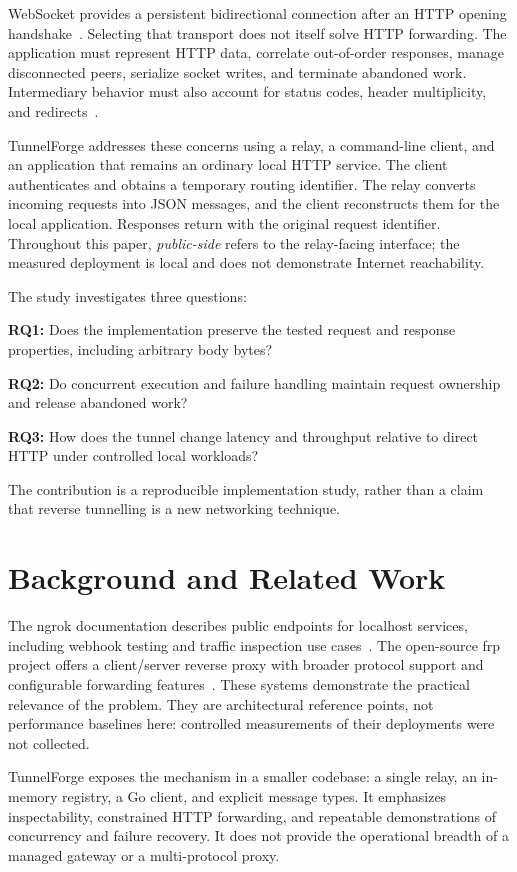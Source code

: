 \documentclass[conference,letterpaper]{IEEEtran}
\begin{document}
WebSocket provides a persistent bidirectional connection after an HTTP opening
handshake~\cite{websocket}. Selecting that transport does not itself solve HTTP
forwarding. The application must represent HTTP data, correlate out-of-order
responses, manage disconnected peers, serialize socket writes, and terminate
abandoned work. Intermediary behavior must also account for status codes,
header multiplicity, and redirects~\cite{http}.

TunnelForge addresses these concerns using a relay, a command-line client, and
an application that remains an ordinary local HTTP service. The client
authenticates and obtains a temporary routing identifier. The relay converts
incoming requests into JSON messages, and the client reconstructs them for the
local application. Responses return with the original request identifier.
Throughout this paper, \emph{public-side} refers to the relay-facing interface;
the measured deployment is local and does not demonstrate Internet reachability.

The study investigates three questions:

\noindent\textbf{RQ1:} Does the implementation preserve the tested request and
response properties, including arbitrary body bytes?

\noindent\textbf{RQ2:} Do concurrent execution and failure handling maintain request
ownership and release abandoned work?

\noindent\textbf{RQ3:} How does the tunnel change latency and throughput relative to
direct HTTP under controlled local workloads?

The contribution is a reproducible implementation study, rather than a claim
that reverse tunnelling is a new networking technique.

\section{Background and Related Work}
The ngrok documentation describes public endpoints for localhost services,
including webhook testing and traffic inspection use cases~\cite{ngrok}. The
open-source frp project offers a client/server reverse proxy with broader
protocol support and configurable forwarding features~\cite{frp}. These systems
demonstrate the practical relevance of the problem. They are architectural
reference points, not performance baselines here: controlled measurements of
their deployments were not collected.

TunnelForge exposes the mechanism in a smaller codebase: a single relay, an
in-memory registry, a Go client, and explicit message types. It emphasizes
inspectability, constrained HTTP forwarding, and repeatable demonstrations of
concurrency and failure recovery. It does not provide the operational breadth
of a managed gateway or a multi-protocol proxy.
\end{document}
